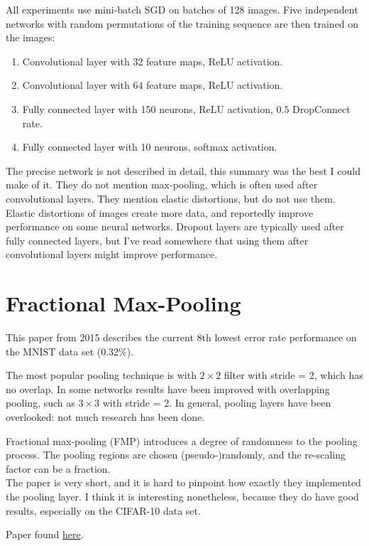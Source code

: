 \documentclass[a4paper, 11pt]{article}
\begin{document}
All experiments use mini-batch SGD on batches of 128 images.
Five independent networks with random permutations of the training sequence are then trained on the images:
\begin{enumerate}[topsep=6pt,itemsep=3pt]
	\item Convolutional layer with 32 feature maps, ReLU activation.
	\item Convolutional layer with 64 feature maps, ReLU activation.
	\item Fully connected layer with 150 neurons, ReLU activation, $0.5$ DropConnect rate.
	\item Fully connected layer with 10 neurons, softmax activation.
\end{enumerate}
The precise network is not described in detail, this summary was the best I could make of it.
They do not mention max-pooling, which is often used after convolutional layers.
They mention elastic distortions, but do not use them.
Elastic distortions of images create more data, and reportedly improve performance on some neural networks.
Dropout layers are typically used after fully connected layers, but I've read somewhere that using them after convolutional layers might improve performance.

\newpage
\section{Fractional Max-Pooling}
This paper from 2015 describes the current 8th lowest error rate performance on the MNIST data set (0.32\%).

The most popular pooling technique is with $2\times2$ filter with stride = 2, which has no overlap.
In some networks results have been improved with overlapping pooling, such as $3\times3$ with stride = 2.
In general, pooling layers have been overlooked: not much research has been done.

Fractional max-pooling (FMP) introduces a degree of randomness to the pooling process.
The pooling regions are chosen (pseudo-)randomly, and the re-scaling factor can be a fraction.\\

\noindent The paper is very short, and it is hard to pinpoint how exactly they implemented the pooling layer.
I think it is interesting nonetheless, because they do have good results, especially on the CIFAR-10 data set.

Paper found \href{https://arxiv.org/pdf/1412.6071.pdf}{\color{blue}here}.\\
\end{document}
